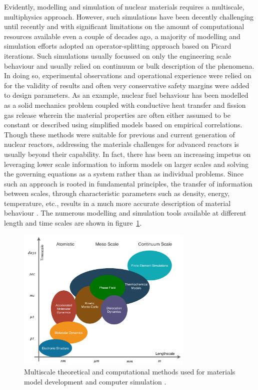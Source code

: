 	 Evidently, modelling and simulation of nuclear materials requires a multiscale, multiphysics approach. However, such simulations have been decently challenging until recently and with significant limitations on the amount of computational resources available even a couple of decades ago, a majority of modelling and simulation efforts adopted an operator-splitting approach based on Picard iterations. Such simulations usually focussed on only the engineering scale behaviour and usually relied on continuum or bulk description of the phenomena. In doing so, experimental observations and operational experience were relied on for the validity of results and often very conservative safety margins were added to design parameters. As an example, nuclear fuel behaviour has been modelled as a solid mechanics problem coupled with conductive heat transfer and fission gas release wherein the material properties are often either assumed to be constant or described using simplified models based on empirical correlations. Though these methods were suitable for previous and current generation of nuclear reactors, addressing the materials challenges for advanced reactors is usually beyond their capability. In fact, there has been an increasing impetus on leveraging lower scale information to inform models on larger scales and solving the governing equations as a system rather than as individual problems.  Since such an approach is rooted in fundamental principles, the transfer of information between scales, through characteristic parameters such as density, energy, temperature, etc., results in a much more accurate description of material behaviour \cite{STAN200920}. The numerous modelling and simulation tools available at different length and time scales are shown in figure~\ref{fig:multiphys}.
	\begin{figure}[htb]
		\centering
		\includegraphics[width=0.75\textwidth]{figures/chapter-1/Multiphysics.pdf}
		\caption[Multiscale methods used for materials modelling simulation]{Multiscale theoretical and computational methods used for materials model development and computer simulation \cite{STAN200920}.}
		\label{fig:multiphys}
	\end{figure}
	
